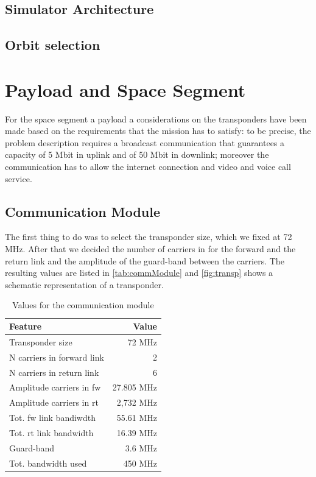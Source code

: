 \documentclass[11pt,a4paper,titlepage]{article}
\begin{document}
	\subsection{Simulator Architecture}
		\lipsum[2]
	\subsection{Orbit selection}
		

\section{Payload and Space Segment}
		For the space segment a payload a considerations on the transponders have been made based on the requirements that the mission has to satisfy: to be precise, the problem description requires a broadcast communication that guarantees a capacity of 5 Mbit in uplink and of 50 Mbit in downlink; moreover the communication has to allow the internet connection and video and voice call service.
	\subsection{Communication Module}
		The first thing to do was to select the transponder size, which we fixed at 72 MHz. After that we decided the number of carriers in for the forward and the return link and the amplitude of the guard-band between the carriers. The resulting values are listed in \autoref{tab:commModule} and \autoref{fig:transp} shows a schematic representation of a transponder.

		\begin{table}
		\centering
		\begin{tabular}{lr}
		\toprule
		Feature & Value\\
		\midrule
		Transponder size & 72 MHz\\
		N carriers in forward link & 2\\
		N carriers in return link & 6\\
		Amplitude carriers in fw & 27.805 MHz\\
		Amplitude carriers in rt & 2,732 MHz\\
		Tot. fw link bandiwdth & 55.61 MHz\\
		Tot. rt link bandwidth & 16.39 MHz\\
		Guard-band & 3.6 MHz\\
		Tot. bandwidth used & 450 MHz\\
		\bottomrule 
		\end{tabular}
		\caption{Values for the communication module}
		\label{tab:commModule}
		\end{table}
		
\end{document}
